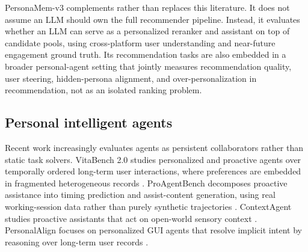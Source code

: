 \documentclass[]{fairmeta}
\begin{document}
PersonaMem-v3 complements rather than replaces this literature. It does not assume an LLM should own the full recommender pipeline. Instead, it evaluates whether an LLM can serve as a personalized reranker and assistant on top of candidate pools, using cross-platform user understanding and near-future engagement ground truth. Its recommendation tasks are also embedded in a broader personal-agent setting that jointly measures recommendation quality, user steering, hidden-persona alignment, and over-personalization in recommendation, not as an isolated ranking problem.


\subsection{Personal intelligent agents}

Recent work increasingly evaluates agents as persistent collaborators rather than static task solvers. VitaBench 2.0 studies personalized and proactive agents over temporally ordered long-term user interactions, where preferences are embedded in fragmented heterogeneous records \citep{chen2026vitabench2}. ProAgentBench decomposes proactive assistance into timing prediction and assist-content generation, using real working-session data rather than purely synthetic trajectories \citep{tang2026proagentbench}. ContextAgent studies proactive assistants that act on open-world sensory context \citep{yang2025contextagent}. PersonalAlign focuses on personalized GUI agents that resolve implicit intent by reasoning over long-term user records \citep{lyu2026personalalign}.
\end{document}
